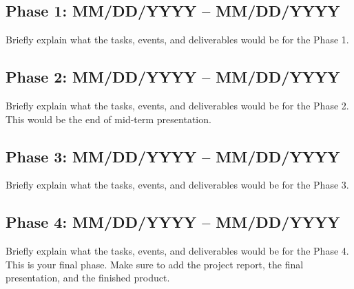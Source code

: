 \documentclass{article}
\begin{document}
\subsection{Phase 1: MM/DD/YYYY -- MM/DD/YYYY}
Briefly explain what the tasks, events, and deliverables would be for the Phase 1.

\subsection{Phase 2: MM/DD/YYYY -- MM/DD/YYYY}
Briefly explain what the tasks, events, and deliverables would be for the Phase 2. This would be the end of mid-term presentation. 

\subsection{Phase 3: MM/DD/YYYY -- MM/DD/YYYY}
Briefly explain what the tasks, events, and deliverables would be for the Phase 3.

\subsection{Phase 4: MM/DD/YYYY -- MM/DD/YYYY}
Briefly explain what the tasks, events, and deliverables would be for the Phase 4. This is your final phase. Make sure to add the project report, the final presentation, and the finished product.

\pagebreak



\end{document}
